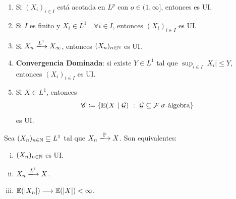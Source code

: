 \begin{eg}
	\begin{enumerate}
		\item Si $(X_{i})_{i \in I}$ está acotada en $L^{p}$ con $o \in (1, \infty]$, entonces es UI.

		\item Si $I$ es finito y $X_{i} \in L^{1} \quad \forall i \in I$, entonces $(X_{i})_{i \in I}$ es UI.

		\item Si $X_{n} \xlongrightarrow{L^{1}} X_{\infty}$, entonces $(X_{n})_{n \in \mathbb{N}}$ es UI.

		\item \textbf{Convergencia Dominada}: si existe $Y \in L^{1}$ tal que $\sup_{i \in I} |X_{i}| \leq Y$, entonces $(X_{i})_{i \in I}$ es UI.

		\item Si $X \in L^{1}$, entonces
		\[ \mathscr{C} \coloneq \{\mathbb{E}(X \ | \ \mathcal{G}) \ : \ \mathcal{G} \subseteq \mathcal{F} \; \sigma\text{-álgebra}\} \]
		es UI.
	\end{enumerate}
\end{eg}

\begin{theorem}
	Sea $(X_{n})_{n \in \mathbb{N}} \subseteq L^{1}$ tal que $X_{n} \xlongrightarrow{\mbb{P}} X$. Son equivalentes:
	\begin{enumerate}[i)]
		\item $(X_{n})_{n \in \mathbb{N}}$ es UI.

		\item $X_{n} \xlongrightarrow{L^{1}} X$.

		\item $\mathbb{E}(|X_{n}|) \longrightarrow \mathbb{E}(|X|) < \infty$.
	\end{enumerate}
\end{theorem}

